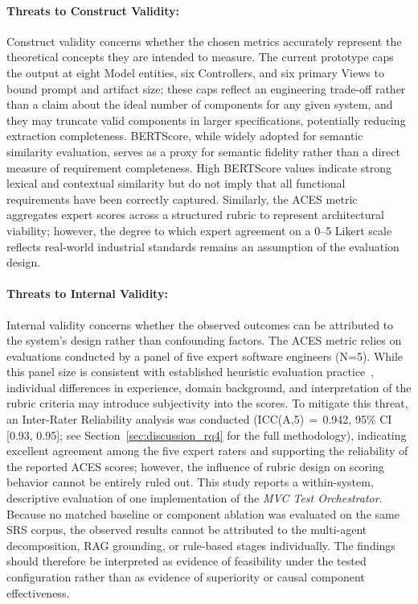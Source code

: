 \paragraph{Threats to Construct Validity:}
Construct validity concerns whether the chosen metrics accurately represent the theoretical concepts they are intended to measure. The current prototype caps the output at eight Model entities, six Controllers, and six primary Views to bound prompt and artifact size; these caps reflect an engineering trade-off rather than a claim about the ideal number of components for any given system, and they may truncate valid components in larger specifications, potentially reducing extraction completeness. BERTScore, while widely adopted for semantic similarity evaluation, serves as a proxy for semantic fidelity rather than a direct measure of requirement completeness. High BERTScore values indicate strong lexical and contextual similarity but do not imply that all functional requirements have been correctly captured. Similarly, the ACES metric aggregates expert scores across a structured rubric to represent architectural viability; however, the degree to which expert agreement on a 0--5 Likert scale reflects real-world industrial standards remains an assumption of the evaluation design.

\paragraph{Threats to Internal Validity:}
Internal validity concerns whether the observed outcomes can be attributed to the system's design rather than confounding factors. The ACES metric relies on evaluations conducted by a panel of five expert software engineers (N=5). While this panel size is consistent with established heuristic evaluation practice~\citep{monasor2014walk}, individual differences in experience, domain background, and interpretation of the rubric criteria may introduce subjectivity into the scores. To mitigate this threat, an Inter-Rater Reliability analysis was conducted (ICC(A,5)\,$=$\,0.942, 95\% CI [0.93, 0.95]; see Section~\ref{sec:discussion_rq4} for the full methodology), indicating excellent agreement among the five expert raters and supporting the reliability of the reported ACES scores; however, the influence of rubric design on scoring behavior cannot be entirely ruled out. This study reports a within-system, descriptive evaluation of one implementation of the \textit{MVC Test Orchestrator}. Because no matched baseline or component ablation was evaluated on the same SRS corpus, the observed results cannot be attributed to the multi-agent decomposition, RAG grounding, or rule-based stages individually. The findings should therefore be interpreted as evidence of feasibility under the tested configuration rather than as evidence of superiority or causal component effectiveness.

